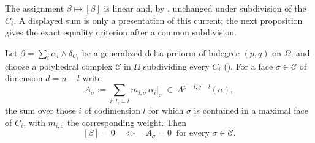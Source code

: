 The assignment $\beta\mapsto[\beta]$ is linear and, by
, unchanged under subdivision of the
$C_i$.  A displayed sum is only a presentation of this current; the next
proposition gives the exact equality criterion after a common subdivision.

\begin{proposition}
\label{prop:ch18-current-faithful}
Let $\beta=\sum_i\alpha_i\wedge\delta_{C_i}$ be a generalized delta-preform
of bidegree $(p,q)$ on $\Omega$, and choose a polyhedral complex
$\mathscr C$ in $\Omega$ subdividing every $C_i$
().  For a face $\sigma\in\mathscr C$
of dimension $d=n-l$ write
\[
 A_\sigma:=\sum_{i:\,l_i=l}m_{i,\sigma}\,\alpha_i\big|_\sigma
 \ \in\ A^{p-l,q-l}(\sigma),
\]
the sum over those $i$ of codimension $l$ for which $\sigma$ is contained in
a maximal face of $C_i$, with $m_{i,\sigma}$ the corresponding weight.  Then
\[
 [\beta]=0
 \quad\Longleftrightarrow\quad
 A_\sigma=0\ \text{ for every }\sigma\in\mathscr C .
\]
\end{proposition}

